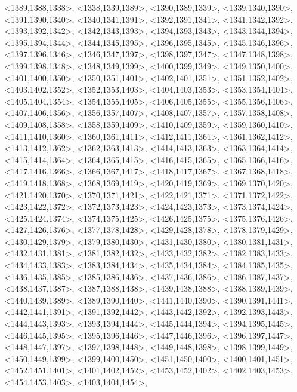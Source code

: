 \documentclass[a4paper,10pt]{article}
\begin{document}
\begin{eulernotebook}
\begin{euleroutput}
  <1389,1388,1338>,
  <1338,1339,1389>,
  <1390,1389,1339>,
  <1339,1340,1390>,
  <1391,1390,1340>,
  <1340,1341,1391>,
  <1392,1391,1341>,
  <1341,1342,1392>,
  <1393,1392,1342>,
  <1342,1343,1393>,
  <1394,1393,1343>,
  <1343,1344,1394>,
  <1395,1394,1344>,
  <1344,1345,1395>,
  <1396,1395,1345>,
  <1345,1346,1396>,
  <1397,1396,1346>,
  <1346,1347,1397>,
  <1398,1397,1347>,
  <1347,1348,1398>,
  <1399,1398,1348>,
  <1348,1349,1399>,
  <1400,1399,1349>,
  <1349,1350,1400>,
  <1401,1400,1350>,
  <1350,1351,1401>,
  <1402,1401,1351>,
  <1351,1352,1402>,
  <1403,1402,1352>,
  <1352,1353,1403>,
  <1404,1403,1353>,
  <1353,1354,1404>,
  <1405,1404,1354>,
  <1354,1355,1405>,
  <1406,1405,1355>,
  <1355,1356,1406>,
  <1407,1406,1356>,
  <1356,1357,1407>,
  <1408,1407,1357>,
  <1357,1358,1408>,
  <1409,1408,1358>,
  <1358,1359,1409>,
  <1410,1409,1359>,
  <1359,1360,1410>,
  <1411,1410,1360>,
  <1360,1361,1411>,
  <1412,1411,1361>,
  <1361,1362,1412>,
  <1413,1412,1362>,
  <1362,1363,1413>,
  <1414,1413,1363>,
  <1363,1364,1414>,
  <1415,1414,1364>,
  <1364,1365,1415>,
  <1416,1415,1365>,
  <1365,1366,1416>,
  <1417,1416,1366>,
  <1366,1367,1417>,
  <1418,1417,1367>,
  <1367,1368,1418>,
  <1419,1418,1368>,
  <1368,1369,1419>,
  <1420,1419,1369>,
  <1369,1370,1420>,
  <1421,1420,1370>,
  <1370,1371,1421>,
  <1422,1421,1371>,
  <1371,1372,1422>,
  <1423,1422,1372>,
  <1372,1373,1423>,
  <1424,1423,1373>,
  <1373,1374,1424>,
  <1425,1424,1374>,
  <1374,1375,1425>,
  <1426,1425,1375>,
  <1375,1376,1426>,
  <1427,1426,1376>,
  <1377,1378,1428>,
  <1429,1428,1378>,
  <1378,1379,1429>,
  <1430,1429,1379>,
  <1379,1380,1430>,
  <1431,1430,1380>,
  <1380,1381,1431>,
  <1432,1431,1381>,
  <1381,1382,1432>,
  <1433,1432,1382>,
  <1382,1383,1433>,
  <1434,1433,1383>,
  <1383,1384,1434>,
  <1435,1434,1384>,
  <1384,1385,1435>,
  <1436,1435,1385>,
  <1385,1386,1436>,
  <1437,1436,1386>,
  <1386,1387,1437>,
  <1438,1437,1387>,
  <1387,1388,1438>,
  <1439,1438,1388>,
  <1388,1389,1439>,
  <1440,1439,1389>,
  <1389,1390,1440>,
  <1441,1440,1390>,
  <1390,1391,1441>,
  <1442,1441,1391>,
  <1391,1392,1442>,
  <1443,1442,1392>,
  <1392,1393,1443>,
  <1444,1443,1393>,
  <1393,1394,1444>,
  <1445,1444,1394>,
  <1394,1395,1445>,
  <1446,1445,1395>,
  <1395,1396,1446>,
  <1447,1446,1396>,
  <1396,1397,1447>,
  <1448,1447,1397>,
  <1397,1398,1448>,
  <1449,1448,1398>,
  <1398,1399,1449>,
  <1450,1449,1399>,
  <1399,1400,1450>,
  <1451,1450,1400>,
  <1400,1401,1451>,
  <1452,1451,1401>,
  <1401,1402,1452>,
  <1453,1452,1402>,
  <1402,1403,1453>,
  <1454,1453,1403>,
  <1403,1404,1454>,

\end{euleroutput}
\end{eulernotebook}
\end{document}
